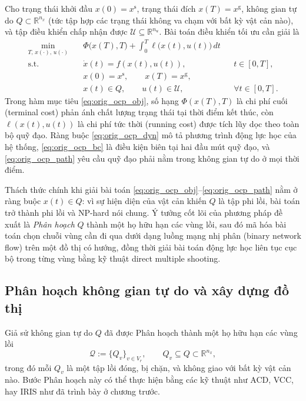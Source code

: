 Cho trạng thái khởi đầu $x(0)=x^{\mathrm{s}}$, trạng thái đích $x(T)=x^{\mathrm{g}}$, không gian tự do $Q\subset\mathbb{R}^{n_x}$ (tức tập hợp các trạng thái không va chạm với bất kỳ vật cản nào), và tập điều khiển chấp nhận được $\mathcal{U}\subseteq\mathbb{R}^{n_u}$. Bài toán điều khiển tối ưu cần giải là
\begin{align}
\min_{T,\,x(\cdot),\,u(\cdot)}\quad
& \Phi\bigl(x(T),T\bigr)+\int_0^T \ell\bigl(x(t),u(t)\bigr)\,dt
\label{eq:orig_ocp_obj}\\
\text{s.t.}\quad
& \dot x(t)=f(x(t),u(t)), && t\in[0,T],
\label{eq:orig_ocp_dyn}\\
& x(0)=x^{\mathrm s},\qquad x(T)=x^{\mathrm g},
\label{eq:orig_ocp_bc}\\
& x(t)\in Q,\qquad u(t)\in \mathcal U, && \forall t\in[0,T].
\label{eq:orig_ocp_path}
\end{align}
Trong hàm mục tiêu \eqref{eq:orig_ocp_obj}, số hạng $\Phi(x(T),T)$ là chi phí cuối (terminal cost) phản ánh chất lượng trạng thái tại thời điểm kết thúc, còn $\ell(x(t),u(t))$ là chi phí tức thời (running cost) được tích lũy dọc theo toàn bộ quỹ đạo. Ràng buộc \eqref{eq:orig_ocp_dyn} mô tả phương trình động lực học của hệ thống, \eqref{eq:orig_ocp_bc} là điều kiện biên tại hai đầu mút quỹ đạo, và \eqref{eq:orig_ocp_path} yêu cầu quỹ đạo phải nằm trong không gian tự do ở mọi thời điểm.

Thách thức chính khi giải bài toán \eqref{eq:orig_ocp_obj}--\eqref{eq:orig_ocp_path} nằm ở ràng buộc $x(t)\in Q$: vì sự hiện diện của vật cản khiến $Q$ là tập phi lồi, bài toán trở thành phi lồi và NP-hard nói chung. Ý tưởng cốt lõi của phương pháp đề xuất là \emph{Phân hoạch} $Q$ thành một họ hữu hạn các vùng lồi, sau đó mã hóa bài toán chọn chuỗi vùng cần đi qua dưới dạng luồng mạng nhị phân (binary network flow) trên một đồ thị có hướng, đồng thời giải bài toán động lực học liên tục cục bộ trong từng vùng bằng kỹ thuật direct multiple shooting.

\subsection{Phân hoạch không gian tự do và xây dựng đồ thị}
\label{subsec:graph_construction}

Giả sử không gian tự do $Q$ đã được Phân hoạch thành một họ hữu hạn các vùng lồi
\[
\mathcal{Q}:=\{Q_v\}_{v\in V_r},
\qquad
Q_v\subseteq Q \subset \mathbb{R}^{n_x},
\]
trong đó mỗi $Q_v$ là một tập lồi đóng, bị chặn, và không giao với bất kỳ vật cản nào. Bước Phân hoạch này có thể thực hiện bằng các kỹ thuật như ACD, VCC, hay IRIS như đã trình bày ở chương trước.

